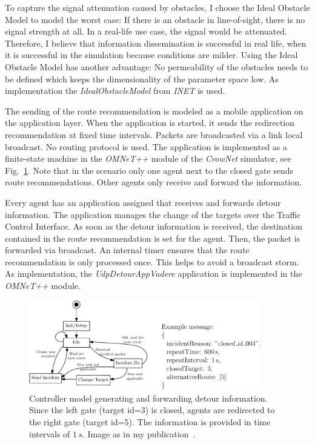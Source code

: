 To capture the signal attenuation caused by obstacles, I choose the Ideal Obstacle Model to model the worst case:  If there is an obstacle in line-of-sight, there is no signal strength at all. In a real-life use case, the signal would be attenuated. Therefore, I believe that information dissemination is successful in real life, when it is successful in the simulation because conditions are milder. Using the Ideal Obstacle Model has another advantage: No permeability of the obstacles needs to be defined which keeps the dimensionality of the parameter space low. As implementation the \textit{IdealObstacleModel} from \textit{INET} is used.
 

The sending of the route recommendation is modeled as a mobile application on the application layer. When the application is started, it sends the redirection recommendation at fixed time intervals. Packets are broadcasted via a link local broadcast. No routing protocol is used. The application is implemented as a finite-state machine in the \textit{OMNeT++} module of the \textit{CrowNet} simulator, see Fig.~\ref{sec:controllermodel}. Note that in the scenario only one agent next to the closed gate sends route recommendations. Other agents only receive and forward the information.

Every agent has an application assigned that receives and forwards detour information. The application manages the change of the targets over the Traffic Control Interface. As soon as the detour information is received, the destination contained in the route recommendation is set for the agent. Then, the packet is forwarded via broadcast. An internal timer ensures that the route recommendation is only processed once. This helps to avoid a broadcast storm. As implementation, the \textit{UdpDetourAppVadere} application is implemented in the \textit{OMNeT++} module.



\begin{figure}[hbt!]
\centering
\includegraphics[width=0.9\textwidth]{figures/investigation/Informationsverbreitung/ControlModel.pdf} 
\caption[Controller model generating and forwarding detour information]{Controller model generating and forwarding detour information. Since the left gate (target id=3) is closed, agents are redirected to the right gate (target id=5). The information is provided in time intervals of $1\,s$. 
Image as in my publication~\cite{mayr-2021-com}.}
\label{sec:controllermodel}
\end{figure}





